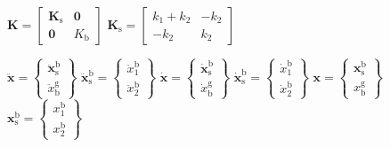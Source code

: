 \begin{center}
$\mathbf{K}=\begin{bmatrix}\mathbf{K}_{\text{s}} & \mathbf{0}\\
\mathbf{0} & K_{\text{b}}
\end{bmatrix}$ \hspace{0.2cm} $\mathbf{K}_{\text{s}}=\begin{bmatrix}k_{1}+k_{2} & -k_{2}\\
-k_{2} & k_{2}
\end{bmatrix}$ \vspace{0.25cm}
\par\end{center}

\begin{center}
$\mathbf{\ddot{x}}=\begin{Bmatrix}\mathbf{\ddot{x}}_{\text{s}}^{\text{b}}\\
\ddot{x}_{\text{b}}^{\text{g}}
\end{Bmatrix}$ \hspace{0.2cm} $\mathbf{\ddot{x}}_{\text{s}}^{\text{b}}=\begin{Bmatrix}\ddot{x}_{1}^{\text{b}}\\
\ddot{x}_{2}^{\text{b}}
\end{Bmatrix}$ \hspace{0.5cm} $\mathbf{\dot{x}}=\begin{Bmatrix}\mathbf{\dot{x}}_{\text{s}}^{\text{b}}\\
\dot{x}_{\text{b}}^{\text{g}}
\end{Bmatrix}$ \hspace{0.2cm} $\mathbf{\dot{x}}_{\text{s}}^{\text{b}}=\begin{Bmatrix}\dot{x}_{1}^{\text{b}}\\
\dot{x}_{2}^{\text{b}}
\end{Bmatrix}$ \hspace{0.5cm} $\mathbf{x}=\begin{Bmatrix}\mathbf{x}_{\text{s}}^{\text{b}}\\
{x}_{\text{b}}^{\text{g}}
\end{Bmatrix}$ \hspace{0.2cm} $\mathbf{x}_{\text{s}}^{\text{b}}=\begin{Bmatrix}{x}_{1}^{\text{b}}\\
{x}_{2}^{\text{b}}
\end{Bmatrix}$ \vspace{0.25cm}
\par\end{center}

